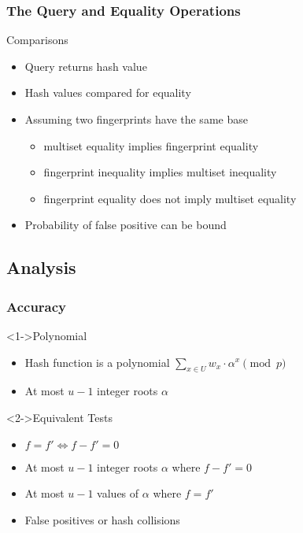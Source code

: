 \begin{frame}
  \frametitle{The Query and Equality Operations}

  \begin{block}{Comparisons}
    \begin{itemize}
      \item Query returns hash value
      \item Hash values compared for equality
      \item Assuming two fingerprints have the same base
      \begin{itemize}
        \item multiset equality implies fingerprint equality
        \item fingerprint inequality implies multiset inequality
        \item fingerprint equality does not imply multiset equality
      \end{itemize}
      \item Probability of false positive can be bound
    \end{itemize}
  \end{block}
\end{frame}

\subsection{Analysis}

\begin{frame}
  \frametitle{Accuracy}

  \begin{block}<1->{Polynomial}
    \begin{itemize}
      \item Hash function is a polynomial \( \sum_{x \in U} w_{x} \cdot \alpha^{x} \pmod p \)
      \item At most \( u - 1 \) integer roots \( \alpha \)
    \end{itemize}
  \end{block}

  \begin{block}<2->{Equivalent Tests}
    \begin{itemize}
      \item \( f = f' \iff f - f' = 0 \)
      \item At most \( u - 1 \) integer roots \( \alpha \) where \( f - f' = 0 \)
      \item At most \( u - 1 \) values of \( \alpha \) where \( f = f' \)
      \item False positives or hash collisions
    \end{itemize}
  \end{block}
\end{frame}

